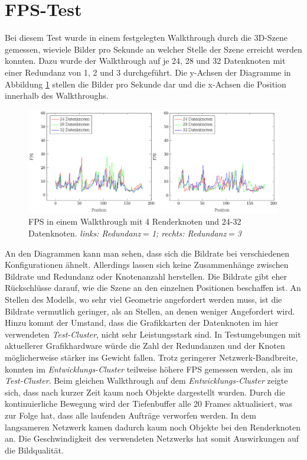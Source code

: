 \section{FPS-Test}
\label{sec:eval:fps}
Bei diesem Test wurde in einem festgelegten Walkthrough durch die 3D-Szene gemessen, wieviele Bilder pro Sekunde an welcher Stelle der Szene erreicht werden konnten. Dazu wurde der Walkthrough auf je 24, 28 und 32 Datenknoten mit einer Redundanz von 1, 2 und 3 durchgeführt. Die y-Achsen der Diagramme in Abbildung \ref{fig:eval:fps} stellen die Bilder pro Sekunde dar und die x-Achsen die Position innerhalb des Walkthroughs.
\begin{figure}
\centering
\includegraphics[scale=0.75]{images/diag_fps.pdf}
  \caption{\label{fig:eval:fps}FPS in einem Walkthrough mit 4 Renderknoten und 24-32 Datenknoten. \textit{links: Redundanz$=$1; rechts: Redundanz$=$3}}
\end{figure}

An den Diagrammen kann man sehen, dass sich die Bildrate bei verschiedenen Konfigurationen ähnelt. Allerdings lassen sich keine Zusammenhänge zwischen Bildrate und Redundanz oder Knotenanzahl herstellen. Die Bildrate gibt eher Rückschlüsse darauf, wie die Szene an den einzelnen Positionen beschaffen ist. An Stellen des Modells, wo sehr viel Geometrie angefordert werden muss, ist die Bildrate vermutlich geringer, als an Stellen, an denen weniger Angefordert wird. Hinzu kommt der Umstand, dass die Grafikkarten der Datenknoten im hier verwendeten \textit{Test-Cluster}, nicht sehr Leistungsstark sind. In Testumgebungen mit aktuellerer Grafikhardware würde die Zahl der Redundanzen und der Knoten möglicherweise stärker ins Gewicht fallen. Trotz geringerer Netzwerk-Bandbreite, konnten im \textit{Entwicklungs-Cluster} teilweise höhere FPS gemessen werden, als im \textit{Test-Cluster}. Beim gleichen Walkthrough auf dem \textit{Entwicklungs-Cluster} zeigte sich, dass nach kurzer Zeit kaum noch Objekte dargestellt wurden. Durch die kontinuierliche Bewegung wird der Tiefenbuffer alle 20 Frames aktualisiert, was zur Folge hat, dass alle laufenden Aufträge verworfen werden. In dem langsameren Netzwerk kamen dadurch kaum noch Objekte bei den Renderknoten an. Die Geschwindigkeit des verwendeten Netzwerks hat somit Auswirkungen auf die Bildqualität.

